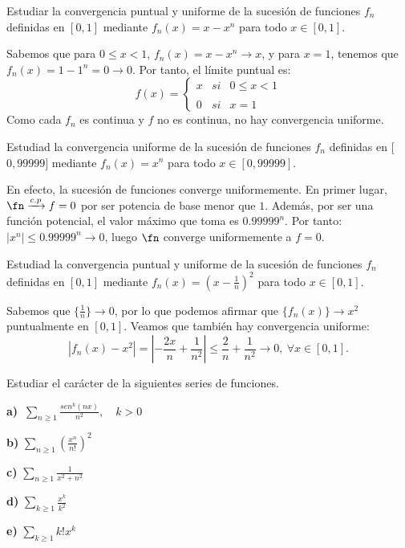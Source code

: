 \begin{ejer}
  Estudiar la convergencia puntual y uniforme de la sucesión de funciones $f_n$ definidas en $[0,1]$ mediante $f_n(x) = x-x^n$ para todo $x\in [0,1]$.
\end{ejer}

 \begin{sol}
    Sabemos que para $0\le x<1$, $f_n(x)=x-x^n \to x$, y para $x=1$, tenemos que $f_n(x)=1-1^n = 0 \to 0$. Por tanto, el límite puntual es: $$f(x)= \left\{ \begin{array}{lcc} x & si & 0 \le x < 1 \\ \\ 0 & si & x=1  \end{array} \right.$$
    Como cada $f_n$ es continua y $f$ no es continua, no hay convergencia uniforme.
  \end{sol}

\begin{ejer}
  Estudiad la convergencia uniforme de la sucesión de funciones $f_n$ definidas en [$0,99999]$ mediante $f_n(x) = x^n$ para todo $x\in [0,99999]$.
\end{ejer}

  \begin{sol}
    En efecto, la sucesión de funciones converge uniformemente. En primer lugar, $\fn \xrightarrow {c.p} f=0$ por ser potencia de base menor que $1$. Además, por ser una función potencial, el valor máximo que toma es $0.99999^n$. Por tanto: $|x^n| \leq 0.99999^n \to 0$, luego $\fn$ converge uniformemente a $f=0$.
  \end{sol}

\begin{ejer}
  Estudiad la convergencia puntual y uniforme de la sucesión de funciones $f_n$ definidas en $[0,1]$ mediante $f_n(x) = (x-\frac{1}{n})^2$ para todo $x\in [0,1]$.
\end{ejer}

  \begin{sol}
    Sabemos que $\{\frac{1}{n}\} \to 0$, por lo que podemos afirmar que $\{f_n(x)\} \to x^2$ puntualmente en $[0,1]$. Veamos que también hay convergencia uniforme: $$|f_n (x) - x^2| = \left|-\frac{2x}{n} + \frac{1}{n^2} \right| \leq \frac{2}{n} + \frac{1}{n^2}\to 0, \ \forall x\in [0,1].$$
  \end{sol}

\begin{ejer}
  Estudiar el carácter de la siguientes series de funciones.

  \textbf{a)} $\ \displaystyle \sum_{n\geq1} \frac{sen^k(nx)}{n^2}, \quad k > 0$



  \textbf{b)} $\displaystyle \sum_{n\geq1} \left(\frac{x^n}{n!}\right)^2$



  \textbf{c)} $\displaystyle \sum_{n\geq1} \frac{1}{x^2+n^2}$



  \textbf{d)} $\displaystyle \sum_{k\geq1} \frac{x^k}{k^2}$


  \textbf{e)} $\displaystyle \sum_{k\geq1} k! x^k$

  \end{ejer}

